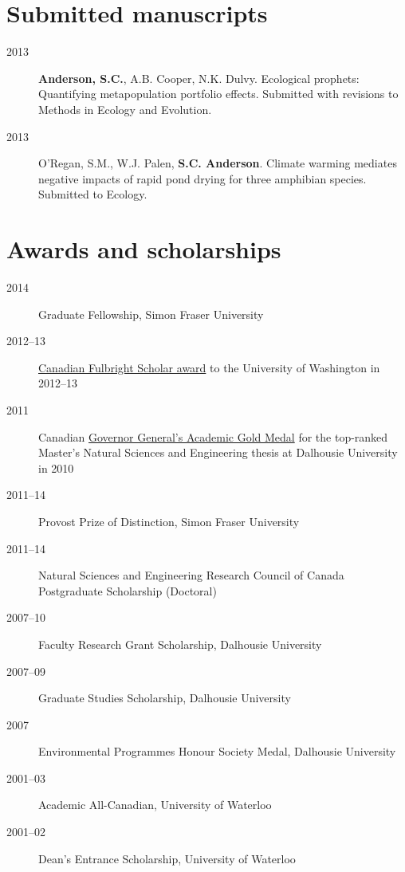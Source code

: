 \section{Submitted manuscripts}

\begin{description}
\item[2013]
\textbf{Anderson, S.C.}, A.B. Cooper, N.K. Dulvy. Ecological prophets:
Quantifying metapopulation portfolio effects. Submitted with revisions
to Methods in Ecology and Evolution.
\item[2013]
O'Regan, S.M., W.J. Palen, \textbf{S.C. Anderson}. Climate warming
mediates negative impacts of rapid pond drying for three amphibian
species. Submitted to Ecology.
\end{description}

\section{Awards and scholarships}

\begin{description}
\item[2014]
Graduate Fellowship, Simon Fraser University
\item[2012--13]
\href{http://www.fulbright.ca/programs/canadian-students/2012-2013-canadian-fulbright-students.html}{Canadian
Fulbright Scholar award} to the University of Washington in 2012--13
\item[2011]
Canadian \href{http://goo.gl/nA1zE}{Governor General's Academic Gold
Medal} for the top-ranked Master's Natural Sciences and Engineering
thesis at Dalhousie University in 2010
\item[2011--14]
Provost Prize of Distinction, Simon Fraser University
\item[2011--14]
Natural Sciences and Engineering Research Council of Canada Postgraduate
Scholarship (Doctoral)
\item[2007--10]
Faculty Research Grant Scholarship, Dalhousie University
\item[2007--09]
Graduate Studies Scholarship, Dalhousie University
\item[2007]
Environmental Programmes Honour Society Medal, Dalhousie University
\item[2001--03]
Academic All-Canadian, University of Waterloo
\item[2001--02]
Dean's Entrance Scholarship, University of Waterloo
\end{description}


